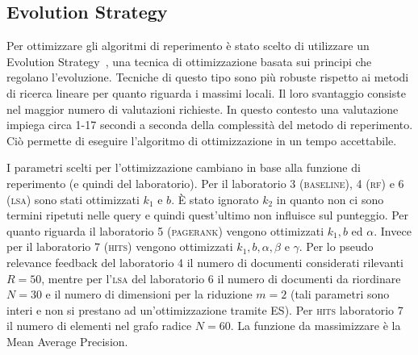 \subsection{Evolution Strategy}
\label{sec:es}

Per ottimizzare gli algoritmi di reperimento \`e stato scelto di utilizzare un Evolution Strategy~\cite{back1996evolutionary}, una tecnica di ottimizzazione basata sui principi che regolano l'evoluzione. Tecniche di questo tipo sono pi\`u robuste rispetto ai metodi di ricerca lineare per quanto riguarda i massimi locali. Il loro svantaggio consiste nel maggior numero di valutazioni richieste. In questo contesto una valutazione impiega circa 1-17 secondi a seconda della complessit\`a del metodo di reperimento. Ci\`o permette di eseguire l'algoritmo di ottimizzazione in un tempo accettabile.

I parametri scelti per l'ottimizzazione cambiano in base alla funzione di reperimento (e quindi del laboratorio). Per il laboratorio 3 (\textsc{baseline}), 4 (\textsc{rf}) e 6 (\textsc{lsa}) sono stati ottimizzati $k_1$ e $b$. \`E stato ignorato $k_2$ in quanto non ci sono termini ripetuti nelle query e quindi  quest'ultimo non influisce sul punteggio. Per quanto riguarda il laboratorio 5 (\textsc{pagerank}) vengono ottimizzati $k_1, b$ ed $\alpha$. Invece per il laboratorio 7 (\textsc{hits}) vengono ottimizzati $k_1, b, \alpha, \beta$ e $\gamma$. Per lo pseudo relevance feedback del laboratorio 4 il numero di documenti considerati rilevanti $R = 50$, mentre per l'\textsc{lsa} del laboratorio 6 il numero di documenti da riordinare $N = 30$ e il numero di dimensioni per la riduzione $m=2$ (tali parametri sono interi e non si prestano ad un'ottimizzazione tramite ES). Per \textsc{hits} laboratorio 7 il numero di elementi nel grafo radice $N=60$. La funzione da massimizzare \`e la Mean Average Precision.

